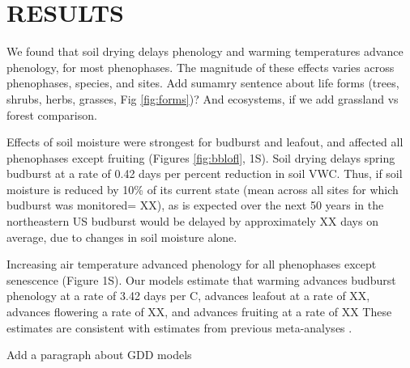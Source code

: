 \documentclass{article}
\begin{document}
\section* {RESULTS}

We found that soil drying delays phenology and warming temperatures advance phenology, for most phenophases. The magnitude of these effects varies across phenophases, species, and sites. Add sumamry sentence about life forms (trees, shrubs, herbs, grasses, Fig \ref{fig:forms})? And ecosystems, if we add grassland vs forest comparison.
\par Effects of soil moisture were strongest for budburst and leafout, and affected all phenophases except fruiting (Figures \ref{fig:bblofl}, 1S). Soil drying delays spring budburst at a rate of 0.42 days per percent reduction in soil VWC. Thus, if soil moisture is reduced by 10\% of its current state (mean across all sites for which budburst was monitored= XX), as is expected over the next 50 years in the northeastern US \citep{berg2017} budburst would be delayed by approximately XX days on average, due to changes in soil moisture alone.

\par  Increasing air temperature advanced phenology for all phenophases except senescence (Figure 1S). Our models estimate that warming advances budburst phenology at a rate of 3.42 days per \degree C, advances leafout at a rate of XX, advances flowering a rate of XX, and advances fruiting at a rate of XX These estimates are consistent with estimates from previous meta-analyses \citep{wolkovich2012}. 

\par  Add a paragraph about GDD models


\end{document}
